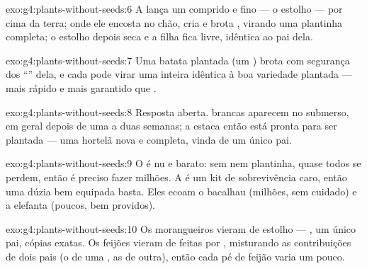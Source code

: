 \begin{solution}{exo:g4:plants-without-seeds:6}
A  lança um  comprido e fino --- o estolho --- por cima
da terra; onde ele encosta no chão, cria  e brota ,
virando uma plantinha completa; o estolho depois seca e a filha fica
livre, idêntica ao pai dela.
\end{solution}

\begin{solution}{exo:g4:plants-without-seeds:7}
Uma batata plantada (um ) brota com segurança dos
``'' dela, e cada  pode virar uma  inteira idêntica à
boa variedade plantada --- mais rápido e mais garantido que
.
\end{solution}

\begin{solution}{exo:g4:plants-without-seeds:8}
Resposta aberta.  brancas aparecem no  submerso, em geral
depois de uma a duas semanas; a estaca então está pronta para ser
plantada --- uma hortelã nova e completa, vinda de um único pai.
\end{solution}

\begin{solution}{exo:g4:plants-without-seeds:9}
O  é nu e barato: sem  nem plantinha, quase
todos se perdem, então é preciso fazer milhões. A  é um kit
de sobrevivência caro, então uma dúzia bem equipada basta. Eles
ecoam o bacalhau (milhões, sem cuidado) e a elefanta (poucos, bem
providos).
\end{solution}

\begin{solution}{exo:g4:plants-without-seeds:10}
Os morangueiros vieram de estolho --- , um
único pai, cópias exatas. Os feijões vieram de  feitas por
, misturando as contribuições de dois pais (o  de uma
, as  de outra), então cada pé de
feijão varia um pouco.
\end{solution}

